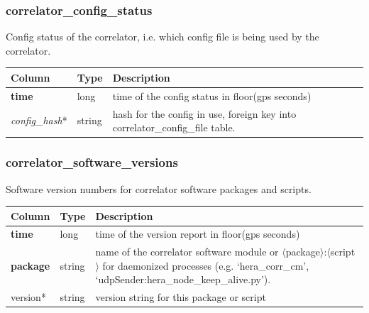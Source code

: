 \documentclass{article}
\begin{document}
{\subsubsection{correlator\_config\_status}
Config status of the correlator, i.e. which config file is being used by the correlator.
\begin{center}
 \begin{tabular}{| p{4cm} | p{2cm} | p{10cm} |}
\hline
 {\bf Column} & {\bf Type}  & {\bf Description} \\ [0.5ex]  \hline\hline
\textbf{time} & long & time of the config status in floor(gps seconds)\\ \hline
\textit{config\_hash}* & string & hash for the config in use, foreign key into correlator\_config\_file table.\\ \hline
\end{tabular}
\end{center}

\subsubsection{correlator\_software\_versions}
Software version numbers for correlator software packages and scripts.
\begin{center}
 \begin{tabular}{| p{4cm} | p{2cm} | p{10cm} |}
\hline
 {\bf Column} & {\bf Type}  & {\bf Description} \\ [0.5ex]  \hline\hline
\textbf{time} & long & time of the version report in floor(gps seconds)\\ \hline
\textbf{package} & string & name of the correlator software module or $\langle$package$\rangle$:$\langle$script$\rangle$ for daemonized processes (e.g. `hera\_corr\_cm', `udpSender:hera\_node\_keep\_alive.py').  \\ \hline
version* & string & version string for this package or script \\\hline
\end{tabular}
\end{center}

}
\end{document}
